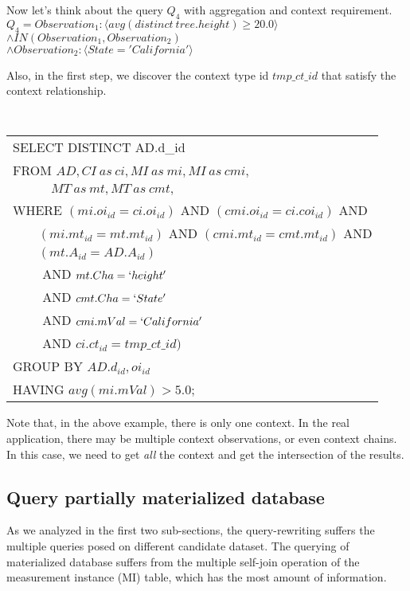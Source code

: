 \documentclass[conference]{IEEEtran}
\begin{document}



Now let's think about the query $Q_4$ with aggregation and context
requirement. 
$Q_4 = Observation_1: \langle avg(distinct~tree.height)\geq 20.0 \rangle$ 
$\wedge IN(Observation_1, Observation_2)$\\
$\wedge Observation_2: \langle State='California'\rangle$


Also, in the first step, we discover the context type id $tmp\_ct\_id$
that satisfy the context relationship. 


\vspace{0.1in}
{\tt 
\begin{tabular}{l}
SELECT DISTINCT AD.d_{id} \\
FROM $AD, CI~as~ci, MI~as~mi, MI~as~cmi,$ \\
$\quad\qquad MT~as~mt, MT~as~cmt,$ \\
WHERE $(mi.oi_{id}=ci.oi_{id})$ AND $(cmi.oi_{id}=ci.coi_{id})$ AND\\
$\qquad (mi.mt_{id}=mt.mt_{id})$ AND $(cmi.mt_{id}=cmt.mt_{id})$ AND\\
$\qquad (mt.A_{id}=AD.A_{id})$\\
$\qquad$ AND $mt.Cha=`height'$\\
$\qquad$ AND $cmt.Cha=`State'$\\
$\qquad$ AND $cmi.mVal=`California'$\\
$\qquad$ AND $ci.ct_{id} = tmp\_ct\_id)$\\
GROUP BY $AD.d_{id}, oi_{id}$\\
HAVING $avg(mi.mVal)>5.0$;
\end{tabular}
}
\vspace{0.1in}

Note that, in the above example, there is only one context.
In the real application, there may be multiple context observations,
or even context chains. In this case, we need to get {\em all} the
context and get the intersection of the results. 


\subsection{Query partially materialized database}
As we analyzed in the first two sub-sections, 
the query-rewriting suffers the multiple queries posed on different
candidate dataset. The querying of materialized database suffers from
the multiple self-join operation of the measurement instance (MI)
table, which has the most amount of information. 
\end{document}
